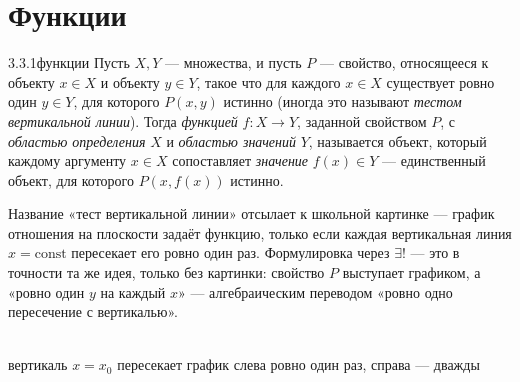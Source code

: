 \section{Функции}

\begin{definition}{3.3.1}{функции}
Пусть $X,Y$ — множества, и пусть $P$ — свойство, относящееся к объекту $x \in X$ и объекту
$y \in Y$, такое что для каждого $x \in X$ существует ровно один $y \in Y$, для которого
$P(x,y)$ истинно (иногда это называют \emph{тестом вертикальной линии}). Тогда \emph{функцией}
$f : X \to Y$, заданной свойством $P$, с \emph{областью определения} $X$ и \emph{областью
значений} $Y$, называется объект, который каждому аргументу $x \in X$ сопоставляет
\emph{значение} $f(x) \in Y$ — единственный объект, для которого $P(x,f(x))$ истинно.
\end{definition}

\begin{intuition}
Название «тест вертикальной линии» отсылает к школьной картинке — график отношения на
плоскости задаёт функцию, только если каждая вертикальная линия $x=\text{const}$ пересекает
его ровно один раз. Формулировка через $\exists!$ — это в точности та же идея, только без
картинки: свойство $P$ выступает графиком, а «ровно один $y$ на каждый $x$» — алгебраическим
переводом «ровно одно пересечение с вертикалью».

\begin{center}
\\
{\footnotesize\color{intuitiongray}вертикаль $x=x_0$ пересекает график слева ровно один раз,
справа — дважды}
\end{center}
\end{intuition}

